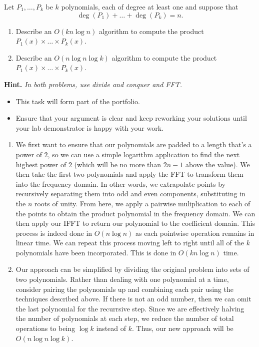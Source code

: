 \documentclass{article}
\begin{document}
\begin{question}
Let $P_1, \dots, P_k$ be $k$ polynomials, each of degree at least one and suppose that \[\deg(P_1) + \dots + \deg(P_k) = n.\]

\begin{enumerate}[label = (\alph*)]
    \item Describe an $O(kn\log n)$ algorithm to compute the product $P_1(x) \times \dots \times P_k(x)$.

    \item Describe an $O(n \log n \log k)$ algorithm to compute the product $P_1(x) \times \dots \times P_k(x)$.
\end{enumerate}

{\bfseries Hint.} {\em In both problems, use divide and conquer and FFT.}
\end{question}

\begin{rubric}
\begin{itemize}
    \item This task will form part of the portfolio.
    \item Ensure that your argument is clear and keep reworking your solutions until your lab demonstrator is happy with your work.
\end{itemize}
\end{rubric}

\begin{solution}
\begin{enumerate}[label = (\alph*)]
    \item We first want to ensure that our polynomials are padded to a length that's a power of $2$, so we can use a simple logarithm application to find the next highest power of $2$ (which will be no more than $2n - 1$ above the value). We then take the first two polynomials and apply the FFT to transform them into the frequency domain. In other words, we extrapolate points by recursively separating them into odd and even components, substituting in the $n$ roots of unity. From here, we apply a pairwise muliplication to each of the points to  obtain the product polynomial in the frequency domain. We can then apply our IFFT to return our polynomial to the coefficient domain. This process is indeed done in $O(n \log n)$ as each pointwise operation remains in linear time. We can repeat this process moving left to right until all of the $k$ polynomials have been incorporated. This is done in $O(k n \log n)$ time.

    \item Our approach can be simplified by dividing the original problem into sets of two polynomials. Rather than dealing with one polynomial at a time, consider pairing the polynomials up and combining each pair using the techniques described above. If there is not an odd number, then we can omit the last polynomial for the recurrsive step. Since we are effectively halving the number of polynomials at each step, we reduce the number of total operations to being $\log k$ instead of $k$. Thus, our new approach will be $O(n \log n \log k)$.
\end{enumerate}
\end{solution}
\end{document}
